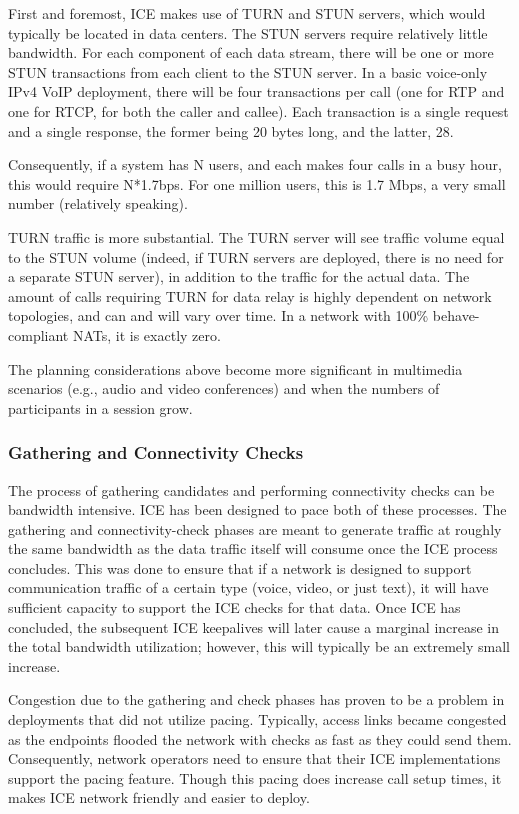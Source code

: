 \documentclass{article}
\begin{document}
First and foremost, ICE makes use of TURN and STUN servers, which would typically be located in data centers.  The STUN servers require relatively little bandwidth.  For each component of each data stream, there will be one or more STUN transactions from each client to the STUN server.  In a basic voice-only IPv4 VoIP deployment, there will be four transactions per call (one for RTP and one for RTCP, for both the caller and callee).  Each transaction is a single request and a single response, the former being 20 bytes long, and the latter, 28.

Consequently, if a system has N users, and each makes four calls in a busy hour, this would require N*1.7bps.  For one million users, this is 1.7 Mbps, a very small number (relatively speaking).

TURN traffic is more substantial.  The TURN server will see traffic volume equal to the STUN volume (indeed, if TURN servers are deployed, there is no need for a separate STUN server), in addition to the traffic for the actual data.  The amount of calls requiring TURN for data relay is highly dependent on network topologies, and can and will vary over time.  In a network with 100\% behave-compliant NATs, it is exactly zero.

The planning considerations above become more significant in multimedia scenarios (e.g., audio and video conferences) and when the numbers of participants in a session grow.

\subsubsection{Gathering and Connectivity Checks}

The process of gathering candidates and performing connectivity checks can be bandwidth intensive.  ICE has been designed to pace both of these processes.  The gathering and connectivity-check phases are meant to generate traffic at roughly the same bandwidth as the data traffic itself will consume once the ICE process concludes. This was done to ensure that if a network is designed to support communication traffic of a certain type (voice, video, or just text), it will have sufficient capacity to support the ICE checks for that data.  Once ICE has concluded, the subsequent ICE keepalives will later cause a marginal increase in the total bandwidth utilization; however, this will typically be an extremely small increase.

Congestion due to the gathering and check phases has proven to be a problem in deployments that did not utilize pacing.  Typically, access links became congested as the endpoints flooded the network with checks as fast as they could send them.  Consequently, network operators need to ensure that their ICE implementations support the pacing feature.  Though this pacing does increase call setup times, it makes ICE network friendly and easier to deploy.
\end{document}
